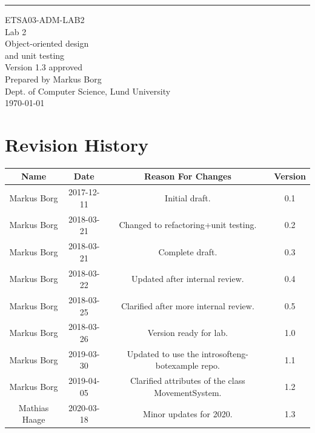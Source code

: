 \documentclass{scrreprt}
\date{}
\def\myversion{1.3 }
\begin{document}
\begin{flushright}
    \rule{16cm}{5pt}\vskip1cm
    \begin{bfseries}
    	\LARGE{ETSA03-ADM-LAB2}\\
    	\vspace{1.5cm}
        \Huge{Lab 2}\\
        \vspace{0.5cm}
        Object-oriented design\\
        \vspace{0.5cm}
        and unit testing\\
        \vspace{1.5cm}
        \LARGE{Version \myversion approved}\\
        \vspace{1.5cm}
        Prepared by Markus Borg\\
        Dept. of Computer Science, Lund University\\
        \vspace{1.5cm}
        \today\\
    \end{bfseries}
\end{flushright}


\chapter*{Revision History}

\begin{center}
    \begin{tabular}{|c|c|c|c|}
        \hline
	    Name & Date & Reason For Changes & Version\\
        \hline
	    Markus Borg & 2017-12-11 & Initial draft. & 0.1\\
        \hline
        Markus Borg & 2018-03-21 & Changed to refactoring+unit testing. & 0.2\\
        \hline
        Markus Borg & 2018-03-21 & Complete draft. & 0.3\\
        \hline
        Markus Borg & 2018-03-22 & Updated after internal review. & 0.4\\
        \hline
        Markus Borg & 2018-03-25 & Clarified after more internal review. & 0.5\\
        \hline
        Markus Borg & 2018-03-26 & Version ready for lab. & 1.0\\
        \hline
        Markus Borg & 2019-03-30 & Updated to use the introsofteng-botexample repo. & 1.1\\
        \hline
        Markus Borg & 2019-04-05 & Clarified attributes of the class MovementSystem. & 1.2\\
        \hline
        Mathias Haage & 2020-03-18 & Minor updates for 2020. & 1.3\\
        \hline
    \end{tabular}
\end{center}
\end{document}
